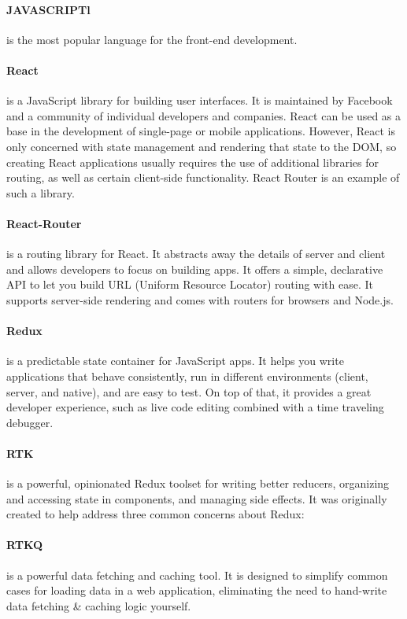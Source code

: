 \paragraph{JAVASCRIPTl}is the most popular language for the front-end development. 


\paragraph{React} is a JavaScript library for building user interfaces. 
It is maintained by Facebook and a community of individual developers and companies.
React can be used as a base in the development of single-page or mobile applications.
However, React is only concerned with state management and rendering that state to the DOM,
so creating React applications usually requires the use of additional libraries for routing,
as well as certain client-side functionality.
React Router is an example of such a library.


\paragraph{React-Router} is a routing library for React.
It abstracts away the details of server and client and allows developers to focus on building apps.
It offers a simple, declarative API to let you build URL (Uniform Resource Locator) routing with ease.
It supports server-side rendering and comes with routers for browsers and Node.js.


\paragraph{Redux} is a predictable state container for JavaScript apps.
It helps you write applications that behave consistently, run in different environments (client, server, and native),
and are easy to test.
On top of that, it provides a great developer experience, such as live code editing combined with a time traveling debugger.


\paragraph{RTK} is a powerful, opinionated Redux toolset for writing better reducers,
organizing and accessing state in components, and managing side effects.
It was originally created to help address three common concerns about Redux:


\paragraph{RTKQ} is a powerful data fetching and caching tool.
It is designed to simplify common cases for loading data in a web application, 
eliminating the need to hand-write data fetching \& caching logic yourself.



